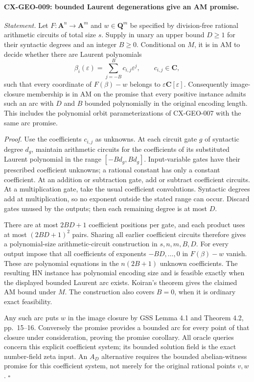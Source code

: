 \documentclass[11pt,a4paper]{article}
\begin{document}
\paragraph{CX-GEO-009: bounded Laurent degenerations give an AM promise.}
\emph{Statement.} Let $F:\mathbf A^n\to\mathbf A^m$ and
$w\in\mathbf Q^m$ be specified by division-free rational arithmetic
circuits of total size $s$. Supply in unary an upper bound $D\ge1$ for
their syntactic degrees and an integer $B\ge0$.
Conditional on $M$, it is in $\mathrm{AM}$ to decide whether there are
Laurent polynomials
\[
 \beta_i(\varepsilon)=\sum_{j=-B}^{B}c_{i,j}\varepsilon^j,
 \qquad c_{i,j}\in\mathbf C,
\]
such that every coordinate of $F(\beta)-w$ belongs to
$\varepsilon\mathbf C[\varepsilon]$.
Consequently image-closure membership is in $\mathrm{AM}$ on the promise
that every positive instance admits such an arc with $D$ and $B$ bounded
polynomially in the original encoding length. This includes the polynomial
orbit parameterizations of CX-GEO-007 with the same arc promise.

\emph{Proof.} Use the coefficients $c_{i,j}$ as unknowns. At each circuit
gate $g$ of syntactic degree $d_g$, maintain arithmetic circuits for the
coefficients of its substituted Laurent polynomial in the range
$[-Bd_g,Bd_g]$. Input-variable gates have their prescribed coefficient
unknowns; a rational constant has only a constant coefficient. At an
addition or subtraction gate, add or subtract coefficient circuits.
At a multiplication gate, take the usual coefficient convolutions.
Syntactic degrees add at multiplication, so no exponent outside the stated
range can occur. Discard gates unused by the outputs; then each remaining
degree is at most $D$.

There are at most $2BD+1$ coefficient positions per gate, and each product
uses at most $(2BD+1)^2$ pairs. Sharing all earlier coefficient circuits
therefore gives a polynomial-size arithmetic-circuit construction in
$s,n,m,B,D$. For every output impose that all coefficients of exponents
$-BD,\ldots,0$ in $F(\beta)-w$ vanish. These are polynomial equations in
the $n(2B+1)$ unknown coefficients. The resulting HN instance has polynomial
encoding size and is feasible exactly when the displayed bounded Laurent
arc exists. Koiran's theorem gives the claimed AM bound under $M$.
The construction also covers $B=0$, when it is ordinary exact feasibility.

Any such arc puts $w$ in the image closure by GSS Lemma 4.1 and Theorem
4.2, pp.~15--16. Conversely the promise provides a bounded arc for every
point of that closure under consideration, proving the promise corollary.
All oracle queries concern this explicit coefficient system; its bounded
solution field is the exact number-field zeta input. An $A_D$ alternative
requires the bounded abelian-witness promise for this coefficient system,
not merely for the original rational points $v,w$.
\hfill$\square$
\end{document}
